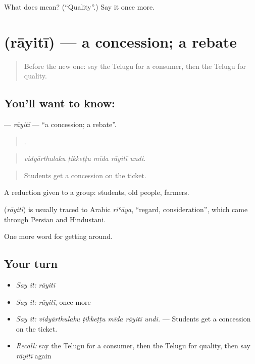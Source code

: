 \begin{tcolorbox}[breakable,colback=teal!4,colframe=teal!35!black,title={Before you move on}]
What does  mean? (\textquotedblleft{}Quality\textquotedblright{}.) Say it once more.
\end{tcolorbox}
\section[\texorpdfstring{\te{రాయితీ} (rāyitī)}{రాయితీ (rāyitī)}]{ (rāyitī) — a concession; a rebate}

\label{lesson:TE-C484-rayiti}



\begin{quote}
Before the new one: say the Telugu for a consumer, then the Telugu for quality.
\end{quote}

\subsection*{You'll want to know: }
\textbf{} — \emph{rāyitī} — \textquotedblleft{}a concession; a rebate\textquotedblright{}.

\begin{quote}
    .
\end{quote}

\begin{quote}
\emph{vidyārthulaku ṭikkeṭṭu mīda rāyitī undi.}
\end{quote}

\begin{quote}
Students get a concession on the ticket.
\end{quote}

A reduction given to a group: students, old people, farmers.

\begin{cousinweb}
\textbf{} (\emph{rāyitī}) is usually traced to Arabic \emph{riʿāya}, \textquotedblleft{}regard, consideration\textquotedblright{}, which came through Persian and Hindustani.
\end{cousinweb}

\begin{grammarlens}[title={What you've built}]
One more word for getting around.
\end{grammarlens}

\subsection*{Your turn}
\begin{itemize}
\raggedright
  \item \emph{Say it:} \emph{rāyitī}
  \item \emph{Say it:} \emph{rāyitī}, once more
  \item \emph{Say it:} \emph{vidyārthulaku ṭikkeṭṭu mīda rāyitī undi.} — Students get a concession on the ticket.
  \item \emph{Recall:} say the Telugu for a consumer, then the Telugu for quality, then say \emph{rāyitī} again
\end{itemize}

